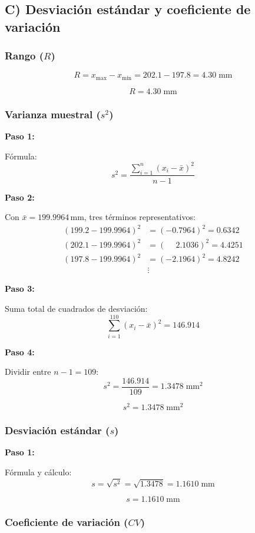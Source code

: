 \documentclass[12pt,letterpaper]{article}
\newcommand{\resultado}[2][Resultado]{%
  \begin{tcolorbox}[resultadoStyle, title={#1}]#2\end{tcolorbox}}
\newcommand{\paso}[1]{%
  \vspace{4pt}%
  \begin{tcolorbox}[pasoStyle]%
    \textbf{\color{azulprin}Paso #1:}%
  \end{tcolorbox}%
  \vspace{2pt}}
\newcommand{\formula}[1]{\vspace{2pt}\[ #1 \]\vspace{-4pt}}
\begin{document}
\subsection{C) Desviaci\'on est\'andar y coeficiente de variaci\'on}

\subsubsection*{Rango ($R$)}

\formula{R = x_{\max} - x_{\min} = 202.1 - 197.8 = 4.30\;\text{mm}}

\resultado[$R$ -- Rango]{\[ R = 4.30\;\text{mm} \]}

\subsubsection*{Varianza muestral ($s^2$)}

\paso{1} F\'ormula:
\formula{s^2 = \frac{\displaystyle\sum_{i=1}^{n}(x_i - \bar{x})^2}{n-1}}

\paso{2} Con $\bar{x} = 199.9964$\,mm, tres t\'erminos representativos:
\begin{align*}
(199.2 - 199.9964)^2 &= (-0.7964)^2 = 0.6342 \\
(202.1 - 199.9964)^2 &= (\phantom{-}2.1036)^2 = 4.4251 \\
(197.8 - 199.9964)^2 &= (-2.1964)^2 = 4.8242 \\
&\vdots
\end{align*}

\paso{3} Suma total de cuadrados de desviaci\'on:
\formula{\sum_{i=1}^{110}(x_i - \bar{x})^2 = 146.914}

\paso{4} Dividir entre $n - 1 = 109$:
\formula{s^2 = \frac{146.914}{109} = 1.3478\;\text{mm}^2}

\resultado[$s^2$ -- Varianza]{\[ s^2 = 1.3478\;\text{mm}^2 \]}

\subsubsection*{Desviaci\'on est\'andar ($s$)}

\paso{1} F\'ormula y c\'alculo:
\formula{s = \sqrt{s^2} = \sqrt{1.3478} = 1.1610\;\text{mm}}

\resultado[$s$ -- Desviaci\'on est\'andar]{\[ s = 1.1610\;\text{mm} \]}

\subsubsection*{Coeficiente de variaci\'on ($CV$)}
\end{document}
